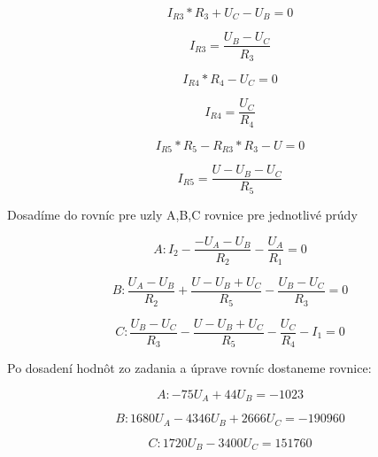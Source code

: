 \documentclass[a4paper,12pt]{article}
\begin{document}
\begin{equation*}
I_{R3}*R_3 + U_C - U_B = 0 
\end{equation*}

\begin{equation*}
I_{R3} = \frac{U_B-U_C}{R_3}
\end{equation*} 

\begin{equation*}
I_{R4}*R_4 - U_C = 0 
\end{equation*} 

\begin{equation*}
I_{R4} = \frac{U_C}{R_4}  
\end{equation*} 

\begin{equation*}
I_{R5}*R_5 - R_{R3}*R_3 - U = 0 
\end{equation*} 

\begin{equation*}
I_{R5} = \frac{U - U_B - U_C}{R_5} 
\end{equation*} 

\begin{flushleft}
Dosadíme do rovníc pre uzly A,B,C rovnice pre jednotlivé prúdy
\end{flushleft}

\begin{equation*}
A: I_2 -\frac{-U_A-U_B}{R_2}-\frac{U_A}{R_1} = 0  
\end{equation*} 

\begin{equation*}
B: \frac{U_A-U_B}{R_2}+\frac{U-U_B+U_C}{R_5}-\frac{U_B-U_C}{R_3} = 0  
\end{equation*} 

\begin{equation*}
C: \frac{U_B-U_C}{R_3}-\frac{U-U_B+U_C}{R_5}-\frac{U_C}{R_4} - I_1 = 0   
\end{equation*} 

\begin{flushleft}
Po dosadení hodnôt zo zadania a úprave rovníc dostaneme rovnice:
\end{flushleft}

\begin{equation*}
A: -75U_A+44U_B = -1023  
\end{equation*} 

\begin{equation*}
B: 1680U_A-4346U_B + 2666U_C = -190960  
\end{equation*} 

\begin{equation*}
C: 1720U_B-3400U_C = 151760
\end{equation*} 
\end{document}
